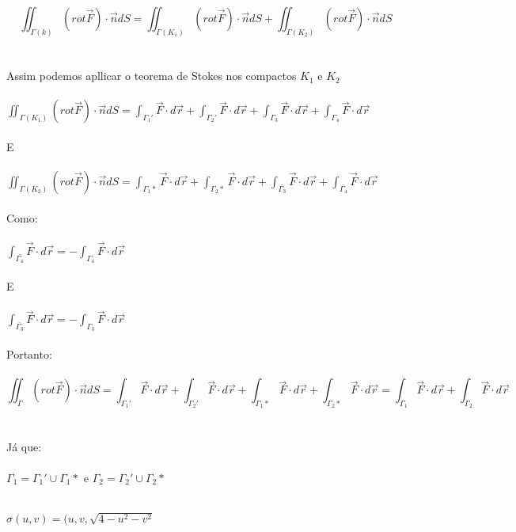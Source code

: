 \documentclass[11pt,a4paper]{article}
\begin{document}
\begin{enumerate}
{{		        $$\iint_{\Gamma(k)} (rot \vec{F}) \cdot\vec{n} dS = \iint_{\Gamma(K_1)} (rot \vec{F}) \cdot\vec{n} dS + \iint_{\Gamma(K_2)}(rot \vec{F}) \cdot\vec{n} dS$$\\\\
		        Assim podemos apllicar o teorema de Stokes nos compactos $K_1$ e $K_2$\\\\
		        $\iint_{\Gamma(K_1)} (rot \vec{F}) \cdot\vec{n} dS = \int_{\Gamma_{1}'} \vec{F}\cdot d\vec{r} + \int_{\Gamma_{2}'} \vec{F}\cdot d\vec{r} + \int_{\Gamma_{3}} \vec{F}\cdot d\vec{r} + \int_{\Gamma_{4}} \vec{F}\cdot d\vec{r}$\\\\
		        E \\\\
		        $\iint_{\Gamma(K_2)} (rot \vec{F}) \cdot\vec{n} dS = \int_{\Gamma_{1}*} \vec{F}\cdot d\vec{r} + \int_{\Gamma_{2}*} \vec{F}\cdot d\vec{r} + \int_{\bar{\Gamma_{3}}} \vec{F}\cdot d\vec{r} + \int_{\bar{\Gamma_{4}}} \vec{F}\cdot d\vec{r}$\\\\
		        Como:\\\\
		        $\int_{\bar{\Gamma_{4}}} \vec{F}\cdot d\vec{r} = - \int_{\Gamma_4} \vec{F}\cdot d\vec{r}$\\\\
		        E\\\\
		        $\int_{\bar{\Gamma_{3}}} \vec{F}\cdot d\vec{r} = - \int_{\Gamma_3} \vec{F}\cdot d\vec{r}$\\\\
		        Portanto:\\\\
		        $$\iint_{\Gamma} (rot \vec{F}) \cdot\vec{n} dS = \int_{\Gamma_{1}'} \vec{F}\cdot d\vec{r} + \int_{\Gamma_{2}'} \vec{F}\cdot d\vec{r} + \int_{\Gamma_{1}*} \vec{F}\cdot d\vec{r} + \int_{\Gamma_{2}*} \vec{F}\cdot d\vec{r} = \int_{\Gamma_{1}} \vec{F}\cdot d\vec{r} + \int_{\Gamma_{2}} \vec{F}\cdot d\vec{r}$$\\\\
		        Já que:\\\\
		        $\Gamma_1 = \Gamma_1 ' \cup \Gamma_1 * $ e $\Gamma_2 = \Gamma_2 ' \cup \Gamma_2 *$\\\\
		        \item $\sigma(u,v) = (u,v,\sqrt{4-u^2-v^2}$\\\\
}}
\end{enumerate}
\end{document}
